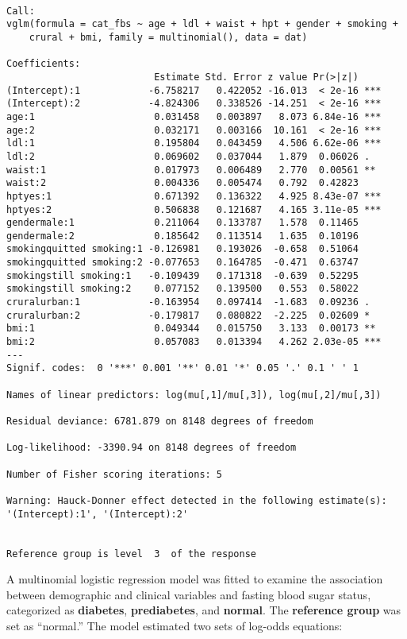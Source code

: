 \documentclass[
  letterpaper,
  DIV=11,
  numbers=noendperiod]{scrartcl}
\begin{document}
\begin{verbatim}

Call:
vglm(formula = cat_fbs ~ age + ldl + waist + hpt + gender + smoking + 
    crural + bmi, family = multinomial(), data = dat)

Coefficients: 
                          Estimate Std. Error z value Pr(>|z|)    
(Intercept):1            -6.758217   0.422052 -16.013  < 2e-16 ***
(Intercept):2            -4.824306   0.338526 -14.251  < 2e-16 ***
age:1                     0.031458   0.003897   8.073 6.84e-16 ***
age:2                     0.032171   0.003166  10.161  < 2e-16 ***
ldl:1                     0.195804   0.043459   4.506 6.62e-06 ***
ldl:2                     0.069602   0.037044   1.879  0.06026 .  
waist:1                   0.017973   0.006489   2.770  0.00561 ** 
waist:2                   0.004336   0.005474   0.792  0.42823    
hptyes:1                  0.671392   0.136322   4.925 8.43e-07 ***
hptyes:2                  0.506838   0.121687   4.165 3.11e-05 ***
gendermale:1              0.211064   0.133787   1.578  0.11465    
gendermale:2              0.185642   0.113514   1.635  0.10196    
smokingquitted smoking:1 -0.126981   0.193026  -0.658  0.51064    
smokingquitted smoking:2 -0.077653   0.164785  -0.471  0.63747    
smokingstill smoking:1   -0.109439   0.171318  -0.639  0.52295    
smokingstill smoking:2    0.077152   0.139500   0.553  0.58022    
cruralurban:1            -0.163954   0.097414  -1.683  0.09236 .  
cruralurban:2            -0.179817   0.080822  -2.225  0.02609 *  
bmi:1                     0.049344   0.015750   3.133  0.00173 ** 
bmi:2                     0.057083   0.013394   4.262 2.03e-05 ***
---
Signif. codes:  0 '***' 0.001 '**' 0.01 '*' 0.05 '.' 0.1 ' ' 1

Names of linear predictors: log(mu[,1]/mu[,3]), log(mu[,2]/mu[,3])

Residual deviance: 6781.879 on 8148 degrees of freedom

Log-likelihood: -3390.94 on 8148 degrees of freedom

Number of Fisher scoring iterations: 5 

Warning: Hauck-Donner effect detected in the following estimate(s):
'(Intercept):1', '(Intercept):2'


Reference group is level  3  of the response
\end{verbatim}

A multinomial logistic regression model was fitted to examine the
association between demographic and clinical variables and fasting blood
sugar status, categorized as \textbf{diabetes}, \textbf{prediabetes},
and \textbf{normal}. The \textbf{reference group} was set as ``normal.''
The model estimated two sets of log-odds equations:
\end{document}

